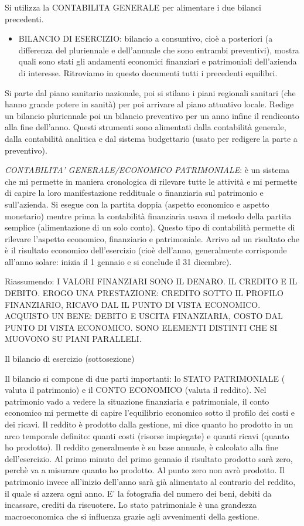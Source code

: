\documentclass[]{article}
\begin{document}
Si utilizza la CONTABILITA GENERALE per alimentare i due bilanci
precedenti.

\begin{itemize}
\item
  BILANCIO DI ESERCIZIO: bilancio a consuntivo, cioè a posteriori (a
  differenza del pluriennale e dell'annuale che sono entrambi
  preventivi), mostra quali sono stati gli andamenti economici
  finanziari e patrimoniali dell'azienda di interesse. Ritroviamo in
  questo documenti tutti i precedenti equilibri.
\end{itemize}

Si parte dal piano sanitario nazionale, poi si stilano i piani regionali
sanitari (che hanno grande potere in sanità) per poi arrivare al piano
attuativo locale. Redige un bilancio pluriennale poi un bilancio
preventivo per un anno infine il rendiconto alla fine dell'anno. Questi
strumenti sono alimentati dalla contabilità generale, dalla contabilità
analitica e dal sistema budgettario (usato per redigere la parte a
preventivo).

\emph{\emph{CONTABILITA' GENERALE/ECONOMICO PATRIMONIALE}}: è un sistema
che mi permette in maniera cronologica di rilevare tutte le attività e
mi permette di capire la loro manifestazione reddituale o finanziaria
sul patrimonio e sull'azienda. Si esegue con la partita doppia (aspetto
economico e aspetto monetario) mentre prima la contabilità finanziaria
usava il metodo della partita semplice (alimentazione di un solo conto).
Questo tipo di contabilità permette di rilevare l'aspetto economico,
finanziario e patrimoniale. Arrivo ad un risultato che è il risultato
economico dell'esercizio (cioè dell'anno, generalmente corrisponde
all'anno solare: inizia il 1 gennaio e si conclude il 31 dicembre).

Riassumendo: I VALORI FINANZIARI SONO IL DENARO. IL CREDITO E IL DEBITO.
EROGO UNA PRESTAZIONE: CREDITO SOTTO IL PROFILO FINANZIARIO, RICAVO DAL
IL PUNTO DI VISTA ECONOMICO. ACQUISTO UN BENE: DEBITO E USCITA
FINANZIARIA, COSTO DAL PUNTO DI VISTA ECONOMICO. SONO ELEMENTI DISTINTI
CHE SI MUOVONO SU PIANI PARALLELI.

Il bilancio di esercizio (sottosezione)

Il bilancio si compone di due parti importanti: lo STATO PATRIMONIALE (
valuta il patrimonio) e il CONTO ECONOMICO (valuta il reddito). Nel
patrimonio vado a vedere la situazione finanziaria e patrimoniale, il
conto economico mi permette di capire l'equilibrio economico sotto il
profilo dei costi e dei ricavi. Il reddito è prodotto dalla gestione, mi
dice quanto ho prodotto in un arco temporale definito: quanti costi
(risorse impiegate) e quanti ricavi (quanto ho prodotto). Il reddito
generalmente è su base annuale, è calcolato alla fine dell'esercizio. Al
primo minuto del primo gennaio il risultato prodotto sarà zero, perchè
va a misurare quanto ho prodotto. Al punto zero non avrò prodotto. Il
patrimonio invece all'inizio dell'anno sarà già alimentato al contrario
del reddito, il quale si azzera ogni anno. E' la fotografia del numero
dei beni, debiti da incassare, crediti da riscuotere. Lo stato
patrimoniale è una grandezza macroeconomica che si influenza grazie agli
avvenimenti della gestione.
\end{document}
